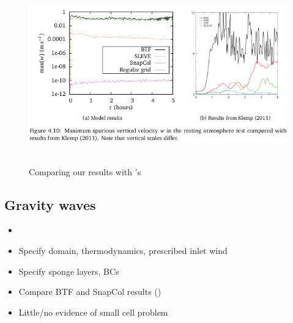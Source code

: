 \documentclass[a4paper]{article}
\begin{document}
\begin{figure}
	\includegraphics[height=3in]{resting-atmosphere-w.png}
%
	\caption{Comparing our results with \textcite{klemp2011}'s}
	\label{fig:resting}
\end{figure}

\subsection{Gravity waves}
\begin{itemize}
	\item {}
	\item Specify domain, thermodynamics, prescribed inlet wind
	\item Specify sponge layers, BCs
	\item Compare BTF and SnapCol results ()
\end{itemize}

\begin{itemize}
	\item Little/no evidence of small cell problem
\end{itemize}
\end{document}
